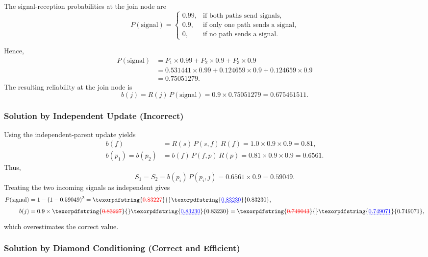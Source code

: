 \documentclass[preprint,12pt]{elsarticle}
\makeatletter
\providecommand{\DIFaddtex}[1]{{\protect\color{blue}\uwave{#1}}} %
\providecommand{\DIFdeltex}[1]{{\protect\color{red}\sout{#1}}} %
\providecommand{\DIFaddbegin}{} %
\providecommand{\DIFaddend}{} %
\providecommand{\DIFdelbegin}{} %
\providecommand{\DIFdelend}{} %
\providecommand{\DIFadd}[1]{\texorpdfstring{\DIFaddtex{#1}}{#1}} %
\providecommand{\DIFdel}[1]{\texorpdfstring{\DIFdeltex{#1}}{}} %
\providecommand{\DIFscaledelfig}{0.5}
\newlength{\DIFdelgraphicswidth} %
\newlength{\DIFdelgraphicsheight} %
\providecommand{\DIFaddincludegraphics}[2][]{{\color{blue}\fbox{\DIFOincludegraphics[#1]{#2}}}} %
\providecommand{\DIFdelincludegraphics}[2][]{%
\sbox{\DIFdelgraphicsbox}{\DIFOincludegraphics[#1]{#2}}%
\settoboxwidth{\DIFdelgraphicswidth}{\DIFdelgraphicsbox} %
\settoboxtotalheight{\DIFdelgraphicsheight}{\DIFdelgraphicsbox} %
\scalebox{\DIFscaledelfig}{%
\parbox[b]{\DIFdelgraphicswidth}{\usebox{\DIFdelgraphicsbox}\\[-\baselineskip] \rule{\DIFdelgraphicswidth}{0em}}\llap{\resizebox{\DIFdelgraphicswidth}{\DIFdelgraphicsheight}{%
\setlength{\unitlength}{\DIFdelgraphicswidth}%
\begin{picture}(1,1)%
\thicklines\linethickness{2pt} %
{\color[rgb]{1,0,0}\put(0,0){\framebox(1,1){}}}%
{\color[rgb]{1,0,0}\put(0,0){\line( 1,1){1}}}%
{\color[rgb]{1,0,0}\put(0,1){\line(1,-1){1}}}%
\end{picture}%
}\hspace*{3pt}}} %
} %
\DeclareRobustCommand{\DIFaddbegin}{\DIFOaddbegin \let\includegraphics\DIFaddincludegraphics} %
\DeclareRobustCommand{\DIFaddend}{\DIFOaddend \let\includegraphics\DIFOincludegraphics} %
\DeclareRobustCommand{\DIFdelbegin}{\DIFOdelbegin \let\includegraphics\DIFdelincludegraphics} %
\DeclareRobustCommand{\DIFdelend}{\DIFOaddend \let\includegraphics\DIFOincludegraphics} %
\let\sout@orig\sout %
\renewcommand{\sout}[1]{\ifmmode\text{\sout@orig{\ensuremath{#1}}}\else\sout@orig{#1}\fi} %
\makeatother
\begin{document}
The signal-reception probabilities at the join node are
\[
P(\text{signal}) =
\begin{cases}
0.99, & \text{if both paths send signals}, \\
0.9,  & \text{if only one path sends a signal}, \\
0,    & \text{if no path sends a signal}.
\end{cases}
\]

Hence,
\begin{align*}
P(\text{signal})
&= P_1 \times 0.99 + P_2 \times 0.9 + P_3 \times 0.9 \\
&= 0.531441 \times 0.99 + 0.124659 \times 0.9 + 0.124659 \times 0.9 \\
&= 0.75051279.
\end{align*}
The resulting reliability at the join node is
\[
b(j)=R(j)\,P(\text{signal})=0.9 \times 0.75051279 = 0.675461511.
\]

\subsubsection{Solution by Independent Update (Incorrect)}

Using the independent-parent update yields
\begin{align*}
b(f) &= R(s)\,P(s,f)\,R(f) = 1.0 \times 0.9 \times 0.9 = 0.81, \\
b(p_1)=b(p_2) &= b(f)\,P(f,p)\,R(p) = 0.81 \times 0.9 \times 0.9 = 0.6561.
\end{align*}
Thus,
\[
S_1 = S_2 = b(p_i)\,P(p_i,j) = 0.6561 \times 0.9 = 0.59049.
\]
Treating the two incoming signals as independent gives
\begin{align*}
P(\text{signal}) &= 1-(1-0.59049)^2 = \DIFdelbegin \DIFdel{0.83227}\DIFdelend \DIFaddbegin \DIFadd{0.83230}\DIFaddend , \\
b(j) &= 0.9 \times \DIFdelbegin \DIFdel{0.83227 }\DIFdelend \DIFaddbegin \DIFadd{0.83230 }\DIFaddend = \DIFdelbegin \DIFdel{0.749043}\DIFdelend \DIFaddbegin \DIFadd{0.749071}\DIFaddend ,
\end{align*}
which overestimates the correct value.

\subsubsection{Solution by Diamond Conditioning (Correct and Efficient)}
\end{document}
